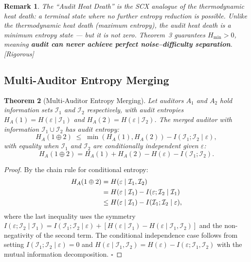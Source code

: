 \documentclass[12pt,a4paper]{article}
\newtheorem{theorem}{Theorem}[section]
\newtheorem{remark}[theorem]{Remark}
\newcommand{\rigorous}{\textcolor{green!50!black}{\small\textsf{[Rigorous]}}}
\newcommand{\cI}{\mathcal{I}}
\begin{document}
\begin{remark}
The ``Audit Heat Death'' is the SCX analogue of the thermodynamic heat death:
a terminal state where no further entropy reduction is possible.  Unlike the
thermodynamic heat death (maximum entropy), the audit heat death is a
\emph{minimum} entropy state — but it is not zero.  Theorem~3 guarantees
$H_{\min}>0$, meaning \textbf{audit can never achieve perfect noise--difficulty
separation}.  \rigorous
\end{remark}

\subsection{Multi-Auditor Entropy Merging}

\begin{theorem}[Multi-Auditor Entropy Merging]
\label{thm:merging}
Let auditors $A_1$ and $A_2$ hold information sets $\cI_1$ and $\cI_2$
respectively, with audit entropies $H_A(1)=H(\varepsilon\mid\cI_1)$ and
$H_A(2)=H(\varepsilon\mid\cI_2)$.  The merged auditor with information
$\cI_1\cup\cI_2$ has audit entropy:
\begin{equation}\label{eq:merging}
    H_A(1\oplus 2)
    \;\leq\; \min(H_A(1), H_A(2))
              - I(\cI_1; \cI_2 \mid \varepsilon),
\end{equation}
with equality when $\cI_1$ and $\cI_2$ are conditionally independent given
$\varepsilon$:
\begin{equation}\label{eq:merging-eq}
    H_A(1\oplus 2)
    = H_A(1) + H_A(2) - H(\varepsilon) - I(\cI_1;\cI_2).
\end{equation}
\end{theorem}

\begin{proof}
By the chain rule for conditional entropy:
\begin{align}
    H_A(1\oplus 2) &= H(\varepsilon \mid \cI_1, \cI_2) \notag\\
    &= H(\varepsilon \mid \cI_1)
       - I(\varepsilon; \cI_2 \mid \cI_1) \notag\\
    &\leq H(\varepsilon \mid \cI_1)
       - I(\cI_1; \cI_2 \mid \varepsilon),
    \label{eq:merging-proof}
\end{align}
where the last inequality uses the symmetry
$I(\varepsilon;\cI_2\mid\cI_1)=I(\cI_1;\cI_2\mid\varepsilon)+
[H(\varepsilon\mid\cI_1)-H(\varepsilon\mid\cI_1,\cI_2)]$ and the non-negativity
of the second term.  The conditional independence case follows from setting
$I(\cI_1;\cI_2\mid\varepsilon)=0$ and
$H(\varepsilon\mid\cI_1,\cI_2)=H(\varepsilon)-I(\varepsilon;\cI_1,\cI_2)$
with the mutual information decomposition. $\square$
\end{proof}
\end{document}
